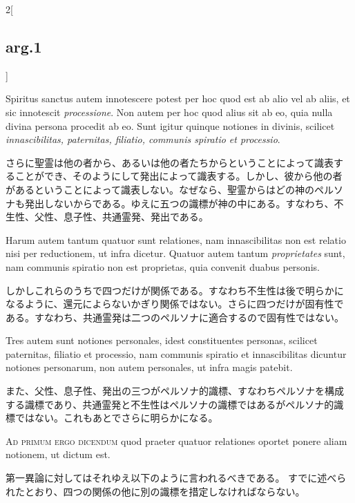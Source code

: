 \documentclass[paper=a4paper,fontsize=10pt,jafontsize=9pt,titlepage]{jlreq}
\begin{document}
\begin{paracol}{2}[\subsection{arg.1}]
\switchcolumn*

Spiritus sanctus autem innotescere potest per hoc quod est
ab alio vel ab aliis, et sic innotescit {\itshape processione}. Non autem per hoc
quod alius sit ab eo, quia nulla divina persona procedit ab eo. Sunt
igitur quinque notiones in divinis, scilicet {\itshape innascibilitas,
paternitas, filiatio, communis spiratio et processio}.

\switchcolumn

さらに聖霊は他の者から、あるいは他の者たちからということによって識表す
ることができ、そのようにして発出によって識表する。しかし、彼から他の者
があるということによって識表しない。なぜなら、聖霊からはどの神のペルソ
ナも発出しないからである。ゆえに五つの識標が神の中にある。すなわち、不
生性、父性、息子性、共通霊発、発出である。

\switchcolumn*

Harum autem
tantum quatuor sunt relationes, nam innascibilitas non est relatio
nisi per reductionem, ut infra dicetur. Quatuor autem tantum
{\itshape proprietates} sunt, nam communis spiratio non est proprietas, quia
convenit duabus personis.

\switchcolumn

しかしこれらのうちで四つだけが関係である。すなわち不生性は後で明らかに
なるように、還元によらないかぎり関係ではない。さらに四つだけが固有性で
ある。すなわち、共通霊発は二つのペルソナに適合するので固有性ではない。

\switchcolumn*

Tres autem sunt notiones personales, idest
constituentes personas, scilicet paternitas, filiatio et processio,
nam communis spiratio et innascibilitas dicuntur notiones personarum,
non autem personales, ut infra magis patebit.

\switchcolumn

また、父性、息子性、発出の三つがペルソナ的識標、すなわちペルソナを構成
する識標であり、共通霊発と不生性はペルソナの識標ではあるがペルソナ的識
標ではない。これもあとでさらに明らかになる。

\switchcolumn*[\subsection{ad.1}]

{\scshape Ad primum ergo dicendum} quod praeter quatuor relationes oportet ponere
aliam notionem, ut dictum est.

\switchcolumn

第一異論に対してはそれゆえ以下のように言われるべきである。
すでに述べられたとおり、四つの関係の他に別の識標を措定しなければならない。


\end{paracol}
\end{document}
